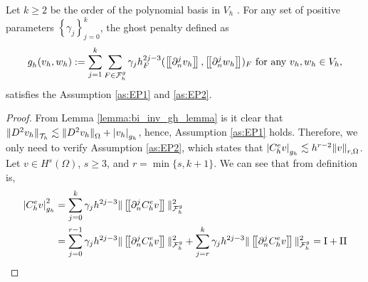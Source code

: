 \begin{proposition}
    Let $k\ge  2$ be the order of the polynomial basis in $V_{h}$ .
    For any set of positive parameters $\left\{ \gamma _{j} \right\} _{j=0}^{k}$, the ghost penalty defined as
    \begin{equation}
        \label{eq:ghost_penalty}
    g^{}_{h}( v_{h},w_{h})  := \sum_{j=1}^{k} \sum_{F \in \mathcal{F} _{h}^{g}}^{} \gamma _{j} h^{2j-3}_{F} ( \left[\!\left[  \partial ^{j}_{n} v_{h}  \right]\!\right], \left[\!\left[  \partial ^{j}_{n} w_{h}  \right]\!\right]  ) _{F} \text{ for any } v_{h},w_{h} \in V_{h},
    \end{equation}
    satisfies the Assumption \ref{as:EP1} and \ref{as:EP2}.
\end{proposition}

\begin{proof}
  From Lemma \ref{lemma:bi_inv_gh_lemma} is it clear that $
    \| D^2v_{h} \|_{ \mathcal{T} _{h} }^{  }  \lesssim \| D^2 v_{h} \|_{ \Omega   }^{  } + \left\lvert  v_{h}  \right\rvert _{g_{h}}
    $, hence, Assumption \ref{as:EP1} holds.
    Therefore, we only need to verify Assumption \ref{as:EP2}, which states that $ \left\lvert  C^{e}_{h} v  \right\rvert_{g_{h}} \lesssim h^{r-2} \| v \|_{r, \Omega   }^{  }$.
    Let $v  \in H^{s}( \Omega ) $, $s\ge 3$,  and $r = \min\{s,k+1\} $. We can see that from definition is,
    \begin{equation}
        \label{eq:est_gh:1}
        \begin{split}
        \left\lvert  C^{e}_{h} v  \right\rvert_{g_{h}}^{2} & = \sum_{j=0}^{k}  \gamma _{j} h^{2j-3}  \| \left[\!\left[  \partial ^{j}_{n} C^{e}_{h} v  \right]\!\right]  \|_{\mathcal{F}_{h}^{g} }^{2} \\
                                        & = \sum_{j=0}^{r-1}  \gamma _{j} h^{2j-3}   \| \left[\!\left[  \partial ^{j}_{n}  C^{e}_{h} v   \right]\!\right]  \|_{\mathcal{F}_{h}^{g} }^{2} + \sum_{j=r}^{k}  \gamma _{j} h^{2j-3}  \| \left[\!\left[  \partial ^{j}_{n} C^{e}_{h} v  \right]\!\right]
                                        \|_{\mathcal{F}_{h}^{g} }^{2} = \mathrm{I} + \mathrm{II}
        \end{split}
    \end{equation}


\end{proof}
